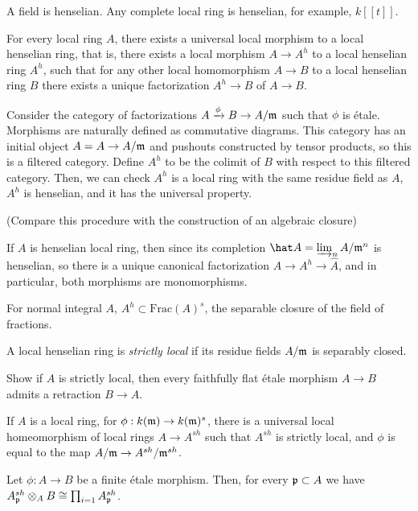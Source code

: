 \documentclass{../../../small}
\begin{document}
\begin{ex*}
A field is henselian.
Any complete local ring is henselian, for example, $k[[t]]$.
\end{ex*}
\begin{prop*}
For every local ring $A$, there exists a universal local morphism to a local henselian ring, that is, there exists a local morphism $A\to A^h$ to a local henselian ring $A^h$, such that for any other local homomorphism $A\to B$ to a local henselian ring $B$ there exists a unique factorization $A^h\to B$ of $A\to B$.
\end{prop*}
\begin{pf}
Consider the category of factorizations $A\xrightarrow{\phi}B\to A/\mathfrak{m}$ such that $\phi$ is \'etale.
Morphisms are naturally defined as commutative diagrams.
This category has an initial object $A=A\to A/\mathfrak{m}$ and pushouts constructed by tensor products, so this is a filtered category.
Define $A^h$ to be the colimit of $B$ with respect to this filtered category.
Then, we can check $A^h$ is a local ring with the same residue field as $A$, $A^h$ is henselian, and it has the universal property.

(Compare this procedure with the construction of an algebraic closure)
\end{pf}

\begin{rmk*}
If $A$ is henselian local ring, then since its completion $\hat A=\varinjlim_n A/\fm^n$ is henselian, so there is a unique canonical factorization $A\to A^h\to \hat A$, and in particular, both morphisms are monomorphisms.
\end{rmk*}
\begin{rmk*}
For normal integral $A$, $A^h\subset\mathrm{Frac}(A)^s$, the separable closure of the field of fractions.
\end{rmk*}

\begin{defn*}
A local henselian ring is \emph{strictly local} if its residue fields $A/\mathfrak{m}$ is separably closed.
\end{defn*}

\begin{exe*}
Show if $A$ is strictly local, then every faithfully flat \'etale morphism $A\to B$ admits a retraction $B\to A$.
\end{exe*}

\begin{prop*}
If $A$ is a local ring, for $\phi:k(\mathfrak{m})\to k(\mathfrak{m})^s$, there is a universal local homeomorphism of local rings $A\to A^{sh}$ such that $A^{sh}$ is strictly local, and $\phi$ is equal to the map $A/\mathfrak{m}\to A^{sh}/\mathfrak{m}^{sh}$.
\end{prop*}
\begin{exe*}
Let $\phi:A\to B$ be a finite \'etale morphism.
Then, for every $\mathfrak{p}\subset A$ we have $A_{\mathfrak{p}}^{sh}\otimes_AB\cong\prod_{i=1}A_{\mathfrak{p}}^{sh}$.
\end{exe*}
\end{document}
